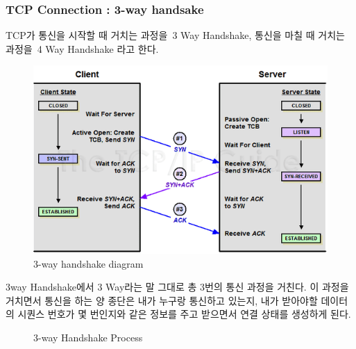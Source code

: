     \subsubsection*{TCP Connection : 3-way handsake}
    TCP가 통신을 시작할 때 거치는 과정을 3 Way Handshake, 통신을 마칠 때 거치는 과정을 4 Way Handshake 라고 한다.
    \vspace{-4mm}  
    \begin{figure}[!h]\centering
		\includegraphics[width=.55\textwidth]{image/week01/1-2-2.png}
		\caption{\small 3-way handshake diagram}
		\vspace{-10pt}
    \end{figure}

    3way Handshake에서 3 Way라는 말 그대로 총 3번의 통신 과정을 거친다. 이 과정을 거치면서 통신을 하는 양 종단은 내가 누구랑 통신하고 있는지, 내가 받아야할 데이터의 시퀀스 번호가 몇 번인지와 같은 정보를 주고 받으면서 연결 상태를 생성하게 된다.
\clearpage
    \begin{figure}[h!]
    \centering
    \hspace{5mm}
    \caption{3-way Handshake Process}
    \vspace{-2mm}
    \end{figure}
